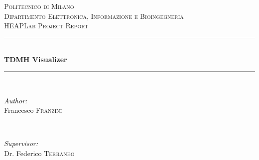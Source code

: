 \begin{titlepage}

\newcommand{\HRule}{\rule{\linewidth}{0.5mm}} %

\center %
 

\textsc{\LARGE Politecnico di Milano}\\[1.5cm] %
\textsc{\Large Dipartimento Elettronica, Informazione e Bioingegneria}\\[0.5cm] %
\textsc{\large HEAPLab Project Report}\\[0.5cm] %


\HRule \\[0.4cm]
{ \huge \bfseries TDMH Visualizer}\\[0.4cm] %
\HRule \\[1.5cm]
 

\begin{minipage}{0.4\textwidth}
\begin{flushleft} \large
\emph{Author:}\\
Francesco \textsc{Franzini} %
\end{flushleft}
\end{minipage}
~
\begin{minipage}{0.4\textwidth}
\begin{flushright} \large
\emph{Supervisor:} \\
Dr. Federico \textsc{Terraneo} %
\end{flushright}
\end{minipage}\\[2cm]



\end{titlepage}
